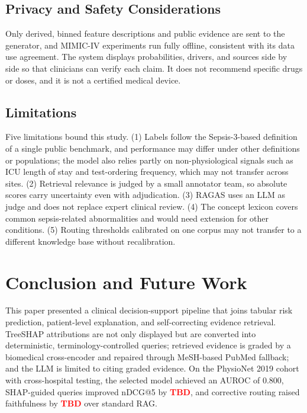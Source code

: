 \documentclass[conference]{IEEEtran}
\newcommand{\tbd}{\textcolor{red}{\textbf{TBD}}}
\begin{document}
\subsection{Privacy and Safety Considerations}
Only derived, binned feature descriptions and public evidence are sent to
the generator, and MIMIC-IV experiments run fully offline, consistent with
its data use agreement. The system displays probabilities, drivers, and
sources side by side so that clinicians can verify each claim. It does not
recommend specific drugs or doses, and it is not a certified medical
device.

\subsection{Limitations}
Five limitations bound this study. (1) Labels follow the Sepsis-3-based
definition of a single public benchmark, and performance may differ under
other definitions or populations; the model also relies partly on
non-physiological signals such as ICU length of stay and test-ordering
frequency, which may not transfer across sites. (2) Retrieval relevance is judged by a
small annotator team, so absolute scores carry uncertainty even with
adjudication. (3) RAGAS uses an LLM as judge and does not replace expert
clinical review. (4) The concept lexicon covers common sepsis-related
abnormalities and would need extension for other conditions. (5) Routing
thresholds calibrated on one corpus may not transfer to a different
knowledge base without recalibration.

\section{Conclusion and Future Work}

This paper presented a clinical decision-support pipeline that joins
tabular risk prediction, patient-level explanation, and self-correcting
evidence retrieval. TreeSHAP attributions are not only displayed but are
converted into deterministic, terminology-controlled queries; retrieved
evidence is graded by a biomedical cross-encoder and repaired through
MeSH-based PubMed fallback; and the LLM is limited to citing graded
evidence. On the PhysioNet 2019 cohort with cross-hospital testing, the
selected model achieved an AUROC of 0.800, SHAP-guided queries improved
nDCG@5 by \tbd{}, and corrective routing raised faithfulness by \tbd{}
over standard RAG.
\end{document}
